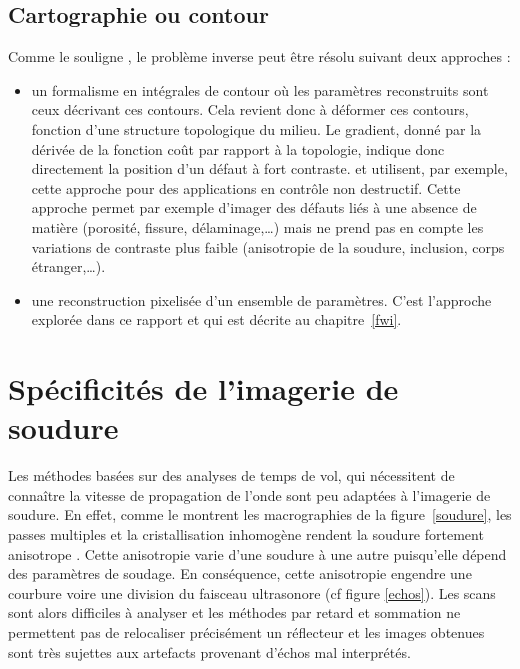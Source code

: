 \subsection{Cartographie ou contour}
Comme le souligne \cite{mat_ac}, le problème inverse peut être résolu suivant deux approches : 
\begin{itemize}
	\item un formalisme en intégrales de contour où les paramètres reconstruits sont ceux décrivant ces contours. Cela revient donc à déformer ces contours, fonction d'une structure topologique du milieu. Le gradient, donné par la dérivée de la fonction coût par rapport à la topologie, indique donc directement la position d'un défaut à fort contraste. \cite{dominguez} et \cite{rodriguez} utilisent, par exemple, cette approche pour des applications en contrôle non destructif. Cette approche permet par exemple d'imager des défauts liés à une absence de matière (porosité, fissure, délaminage,\ldots) mais ne prend pas en compte les variations de contraste plus faible (anisotropie de la soudure, inclusion, corps étranger,\ldots).
	\item une reconstruction pixelisée d'un ensemble de paramètres. C'est l'approche explorée dans ce rapport et qui est décrite au chapitre~\ref{fwi}.
\end{itemize}




\section{Spécificités de l'imagerie de soudure}

Les méthodes basées sur des analyses de temps de vol, qui nécessitent de connaître la vitesse de propagation de l'onde sont peu adaptées à l'imagerie de soudure. En effet, comme le montrent les macrographies de la figure~\ref{soudure}, les passes multiples et la cristallisation inhomogène rendent la soudure fortement anisotrope \citep{chassignole}. Cette anisotropie varie d'une soudure à une autre puisqu'elle dépend des paramètres de soudage. En conséquence, cette anisotropie engendre une courbure voire une division du faisceau ultrasonore (cf figure \ref{echos}). Les scans sont alors difficiles à analyser et les méthodes par retard et sommation ne permettent pas de relocaliser précisément un réflecteur et les images obtenues sont très sujettes aux artefacts provenant d'échos mal interprétés.

